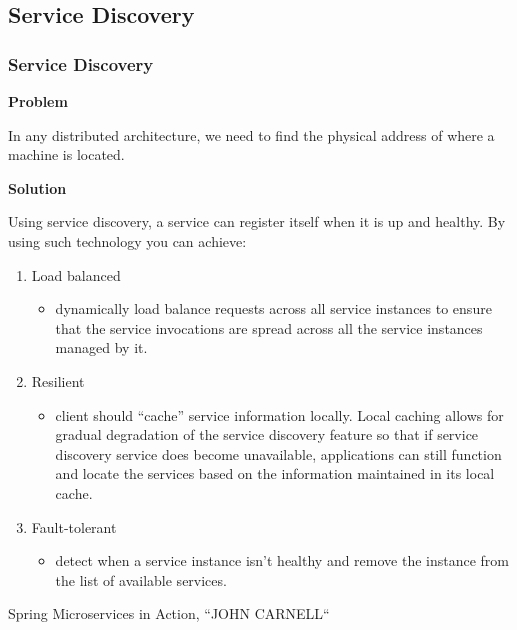 \documentclass{beamer}
\begin{document}
	\subsection {Service Discovery}
		\begin{frame}
			\frametitle{Service Discovery}
				\textbf {Problem} \par
					\small {In any distributed architecture, we need to find the physical address of where a machine is located}.
				
				\vspace{2mm}
				\textbf {Solution} \par	
					Using service discovery, a service can register itself when it is up and healthy. By using such technology you can achieve: 
						\begin{enumerate}
							\item<1->	Load balanced
								\begin{itemize}
									\item \scriptsize {dynamically load balance requests across all service instances to ensure that the service invocations are spread across all the service instances managed by it.}
								\end{itemize}
							\item<2-> 	Resilient
								\begin{itemize}
									\item \scriptsize {client should “cache” service information locally. Local caching allows for gradual 		degradation of the service discovery feature so that if service discovery service does become unavailable, applications can still function and locate the services based on the information maintained in its local cache.}
								\end{itemize}
							\item<3->	Fault-tolerant
								\begin{itemize}
									\item \scriptsize {detect when a service instance isn’t healthy and remove the instance from the list of available services.}
								\end{itemize}
							
						\end{enumerate}
			\vspace{10mm}
			\tiny{Spring Microservices in Action, ``JOHN CARNELL``}	
		\end{frame}
		
\end{document}

